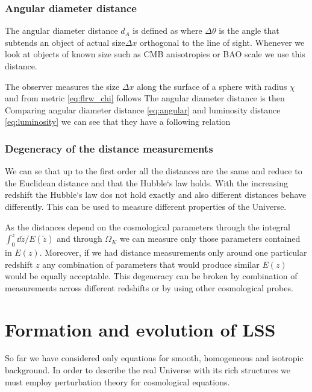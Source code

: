 \subsubsection{Angular diameter distance}
The angular diameter distance $d_A$ is defined as
where $\Delta\theta$ is the angle that subtends an object of actual size$\Delta x$ orthogonal to the line of sight. Whenever we look at objects of known size such as CMB anisotropies or BAO scale we use this distance.

The observer measures the size $\Delta x$ along the surface of a sphere with radius $\chi$ and from metric \eqref{eq:flrw_chi} follows
The angular diameter distance is then
Comparing angular diameter distance \eqref{eq:angular} and luminosity distance \eqref{eq:luminosity} we can see that they have a following relation
\subsubsection{Degeneracy of the distance measurements}
We can se that up to the first order all the distances are the same and reduce to the Euclidean distance and that the Hubble`s law holds. With the increasing redshift the Hubble`s law dos not hold exactly and also different distances behave differently. This can be used to measure different properties of the Universe.

As the distances depend on the cosmological parameters through the integral $\int_0^z{\dd\tilde z/E(\tilde z)}$ and through $\Omega_K$ we can measure only those parameters contained in $E(z)$. Moreover, if we had distance measurements only around one particular redshift $z$ any combination of parameters that would produce similar $E(z)$ would be equally acceptable. This degeneracy can be broken by combination of measurements across different redshifts or by using other cosmological probes.

\section{Formation and evolution of LSS}
So far we have considered only equations for smooth, homogeneous and isotropic background. In order to describe the real Universe with its rich structures we must employ perturbation theory for cosmological equations.
